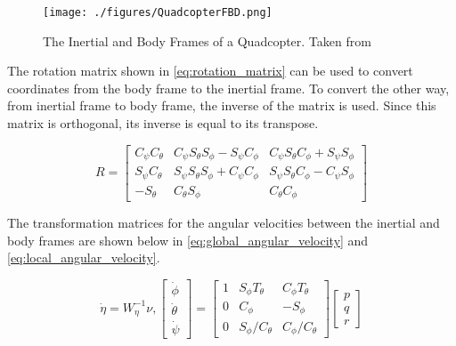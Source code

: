 \documentclass[letterpaper,12pt,titlepage,oneside,final]{book}
\begin{document}
\begin{figure}
\centering
\texttt{[image: ./figures/QuadcopterFBD.png]}
\caption{The Inertial and Body Frames of a Quadcopter. Taken from \cite{luukkonen} } %
\label{fig:FBD}
\end{figure}

The rotation matrix shown in \eqref{eq:rotation_matrix} can be used to convert coordinates from the body frame to the inertial frame. 
To convert the other way, from inertial frame to body frame, the inverse of the matrix is used. 
Since this matrix is orthogonal, its inverse is equal to its transpose.

\begin{equation} \label{eq:rotation_matrix}
R = 
\begin{bmatrix}
C_{\psi}C_{\theta} & C_{\psi}S_{\theta}S_{\phi} - S_{\psi}C_{\phi} & C_{\psi}S_{\theta}C_{\phi} + S_{\psi}S_{\phi} \\
S_{\psi}C_{\theta} & S_{\psi}S_{\theta}S_{\phi} + C_{\psi}C_{\phi} & S_{\psi}S_{\theta}C_{\phi} - C_{\psi}S_{\phi} \\
-S_{\theta} & C_{\theta}S_{\phi} & C_{\theta}C_{\phi}
\end{bmatrix}
\end{equation}

The transformation matrices for the angular velocities between the inertial and body frames are shown below in \eqref{eq:global_angular_velocity} and \eqref{eq:local_angular_velocity}.

\begin{equation} \label{eq:global_angular_velocity}
\dot{\eta} = W_{\eta}^{-1}\nu, 
\begin{bmatrix}
\dot{\phi} \\
\dot{\theta} \\
\dot{\psi}
\end{bmatrix}
=
\begin{bmatrix}
1 & S_{\phi}T_{\theta} & C_{\phi}T_{\theta} \\
0 & C_{\phi} & -S_{\phi} \\
0 & S_{\phi}/C_{\theta} & C_{\phi}/C_{\theta}
\end{bmatrix}
\begin{bmatrix}
p \\
q \\
r
\end{bmatrix}
\end{equation}
\end{document}
